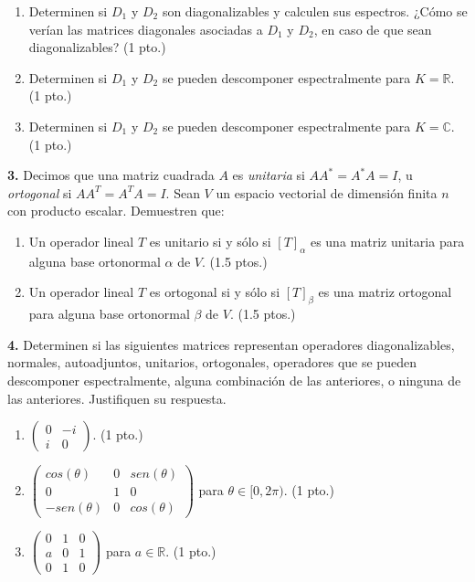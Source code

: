 \documentclass[a4paper]{article}
\begin{document}
\begin{enumerate}[label=(\alph*)]
    \item Determinen si $D_1$ y $D_2$ son diagonalizables y calculen sus espectros. ¿Cómo se verían las matrices diagonales asociadas a $D_1$ y $D_2$, en caso de que sean diagonalizables? (1 pto.)
    \item Determinen si $D_1$ y $D_2$ se pueden descomponer espectralmente para $K=\mathbb{R}$. (1 pto.)
    \item Determinen si $D_1$ y $D_2$ se pueden descomponer espectralmente para $K=\mathbb{C}$. (1 pto.)
\end{enumerate}

\vspace{5mm}
\textbf{3.} Decimos que una matriz cuadrada $A$ es \emph{unitaria} si $A A^*=A^*A=I$, u \emph{ortogonal} si $A A^T = A^T A = I$. Sean $V$ un espacio vectorial de dimensión finita $n$ con producto escalar. Demuestren que:

\begin{enumerate}[label=(\alph*)]
    \item Un operador lineal $T$ es unitario si y sólo si $[T]_\alpha$ es una matriz unitaria para alguna base ortonormal $\alpha$ de $V$. (1.5 ptos.)
    \item Un operador lineal $T$ es ortogonal si y sólo si $[T]_\beta$ es una matriz ortogonal para alguna base ortonormal $\beta$ de $V$. (1.5 ptos.)
\end{enumerate}

\newpage
\textbf{4.} Determinen si las siguientes matrices representan operadores diagonalizables, normales, autoadjuntos, unitarios, ortogonales, operadores que se pueden descomponer espectralmente, alguna combinación de las anteriores, o ninguna de las anteriores. Justifiquen su respuesta.

\begin{enumerate}[label=(\alph*)]
    \item $\begin{pmatrix} 0 & -i \\ i & 0 \end{pmatrix}.$ (1 pto.)
    \item $\begin{pmatrix} cos(\theta) & 0 & sen(\theta) \\ 0 & 1 & 0 \\ -sen(\theta) & 0 & cos(\theta) \end{pmatrix}$ para $\theta\in[0,2\pi)$. (1 pto.)
    \item $\begin{pmatrix} 0 & 1 & 0 \\ a & 0 & 1 \\ 0 & 1 & 0 \end{pmatrix}$ para $a\in \mathbb{R}$. (1 pto.)
\end{enumerate}
\end{document}
